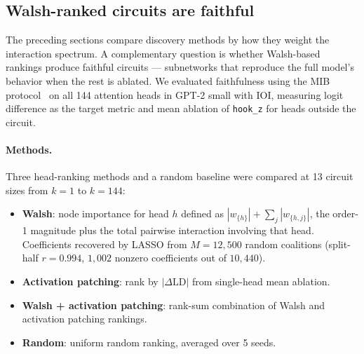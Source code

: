 %
%

\subsection{Walsh-ranked circuits are faithful}
\label{sec:mib-benchmark}

The preceding sections compare discovery methods by how they weight the
interaction spectrum. A complementary question is whether
Walsh-based rankings produce faithful circuits ---
subnetworks that reproduce the full model's behavior when the rest is
ablated. We evaluated faithfulness using the MIB
protocol~\citep{mueller2025mib} on all 144 attention heads in GPT-2
small with IOI, measuring logit difference as the target metric and
mean ablation of \texttt{hook\_z} for heads outside the circuit.

\paragraph{Methods.}

Three head-ranking methods and a random baseline were compared at 13
circuit sizes from $k = 1$ to $k = 144$:

\begin{itemize}
\item \textbf{Walsh}: node importance for head $h$ defined as
  $|w_{\{h\}}| + \sum_j |w_{\{h,j\}}|$, the order-1 magnitude plus
  the total pairwise interaction involving that head. Coefficients
  recovered by LASSO from $M = 12{,}500$ random coalitions
  (split-half $r = 0.994$, $1{,}002$ nonzero coefficients out of
  $10{,}440$).
\item \textbf{Activation patching}: rank by $|\Delta\text{LD}|$ from
  single-head mean ablation.
\item \textbf{Walsh + activation patching}: rank-sum combination of
  Walsh and activation patching rankings.
\item \textbf{Random}: uniform random ranking, averaged over 5 seeds.
\end{itemize}

